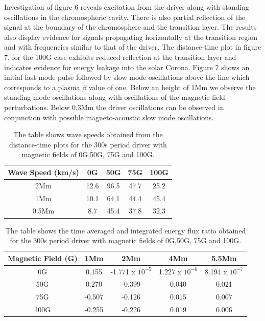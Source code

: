 \documentclass[linenumbers]{aastex63}
\begin{document}
Investigation of figure 6 reveals excitation from the driver along with standing oscillations in the chromospheric cavity. There is also partial reflection of the signal at the boundary of the chromosphere and the transition layer. The results also display evidence for signals propagating horizontally at the transition region and with frequencies similar to that of the driver. The distance-time plot in figure 7, for the 100G case exhibits reduced reflection at the transition layer and indicates evidence for energy leakage into the solar Corona. Figure 7 shows an initial fast mode pulse followed by slow mode oscillations above the line which corresponds to a plasma  $\beta$ value of one. Below an height of 1Mm we observe the standing mode oscillations along with oscillations of the magnetic field perturbations. Below 0.3Mm the driver oscillations can be observed in conjunction with possible magneto-acoustic slow mode oscillations.
\begin{table}\label{wavespeeds}
\centering
\begin{tabular}{c c c c c}
\hline
Wave Speed (km/s)   &  0G  &  50G &  75G & 100G\\
\hline
2Mm & 12.6  &   96.5       &   47.7      &  25.2     \\
\hline
1Mm & 10.1  &    64.1      &   44.4     &   45.4      \\
\hline
0.5Mm & 8.7  &   45.4      &   37.8      &   32.3    \\
\hline

\end{tabular} 
\caption{The table shows wave speeds obtained from the distance-time plots for the 300s period driver with magnetic fields of 0G,50G, 75G and 100G.}
\label{Tablewavespeeds_300s}
\end{table}

\begin{table}\label{energyflux}
\centering
\begin{tabular}{c c c c c}
\hline
Magnetic Field (G)   &  1Mm  &  2Mm &  4Mm & 5.5Mm \\
\hline
0G & 0.155  &    -1.771 x $10^{-5}$      &   1.227 x $10^{-6}$     &   8.194 x $10^{-7}$      \\
\hline
50G & 0.270  &   -0.399       &   0.040      &  0.021     \\
\hline
75G & -0.507  &    -0.126      &   0.015     &   0.007      \\
\hline
100G & -0.255  &   -0.226      &   0.019      &   0.006    \\
\hline

\end{tabular} 
\caption{The table shows the time averaged and integrated energy flux ratio obtained  for the 300s period driver with magnetic fields of 0G,50G, 75G and 100G.}
\label{energyfluxratio}
\end{table}
\end{document}
